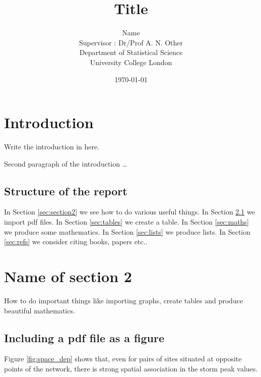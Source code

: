 \documentclass[a4paper,12pt,titlepage]{article} %
\title{Title}
\author{Name \vspace{2cm} \\
Supervisor : Dr/Prof A. N. Other \vspace{2cm} \\
Department of Statistical Science \\
University College London}
\date{\today} %
\numberwithin{equation}{section}  %
\begin{document}
\maketitle         %
\tableofcontents   %
\newpage           %

\section{Introduction}             %
\label{sec:intro}                  %
Write the introduction in here.    %

Second paragraph of the introduction \ldots  %

\subsection{Structure of the report}         %
\label{sec:structure}                        %
In Section \ref{sec:section2} we see how to do various useful things.
In Section \ref{sec:graphs} we import pdf files.
In Section \ref{sec:tables} we create a table. %
In Section \ref{sec:maths} we produce some mathematics.
In Section \ref{sec:lists} we produce lists.
In Section \ref{sec:refs} we consider citing books, papers etc..

\section{Name of section 2}                      %
How to do important things like importing graphs, create tables and produce beautiful mathematics.
\label{sec:section2}                             %
\subsection{Including a pdf file as a figure}    %
\label{sec:graphs}
Figure \ref{fig:space_dep} shows that, even for pairs of sites situated at opposite points of the network, there is strong spatial association in the storm peak values.
\end{document}
